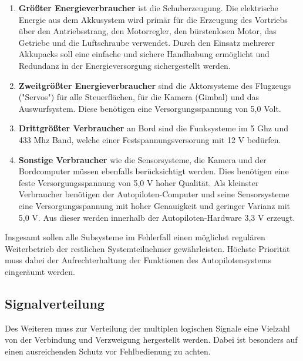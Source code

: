 \begin{enumerate}
    \item \textbf{Größter Energieverbraucher} ist die Schuberzeugung. Die elektrische Energie aus dem Akkusystem wird primär für die Erzeugung des Vortriebs über den Antriebsstrang, den Motorregler, den bürstenlosen Motor, das Getriebe und die Luftschraube verwendet. Durch den Einsatz mehrerer Akkupacks soll eine einfache und sichere Handhabung ermöglicht und Redundanz in der Energieversorgung sichergestellt werden.
    \begin{comment}??? In diesem Pfad soll die Verwendung mehrerer Quellen (Akkupacks) bei sicherer Handhabung ermöglicht werden. ???\end{comment}
    
    \item \textbf{Zweitgrößter Energieverbraucher} sind die Aktorsysteme des Flugzeugs ("Servos") für alle Steuerflächen, für die Kamera (Gimbal) und das Auswurfsystem. Diese benötigen eine Versorgungsspannung von 5,0 Volt.
    
    \item \textbf{Drittgrößter Verbraucher} an Bord sind die Funksysteme im 5 Ghz und 433 Mhz Band, welche einer Festspannungsversorung mit 12 V  bedürfen.

    \item \textbf{Sonstige Verbraucher} wie die Sensorsysteme, die Kamera und der Bordcomputer müssen ebenfalls berücksichtigt werden. Dies benötigen eine feste Versorgungsspannung von 5,0 V hoher Qualität. Als kleinster Verbraucher benötigen der Autopiloten-Computer und seine Sensorsysteme eine Versorgungsspannung mit hoher Genauigkeit und geringer Varianz mit 5,0 V. Aus dieser werden innerhalb der Autopiloten-Hardware 3,3 V erzeugt.
\end{enumerate}

Insgesamt sollen alle Subsysteme im Fehlerfall einen möglichst regulären Weiterbetrieb der restlichen Systemteilnehmer gewährleisten. Höchste Priorität muss dabei der Aufrechterhaltung der Funktionen des Autopilotensystems eingeräumt werden.


\subsection{Signalverteilung}

Des Weiteren muss zur Verteilung der multiplen logischen Signale eine Vielzahl von der Verbindung und Verzweigung hergestellt werden. Dabei ist besonders auf einen ausreichenden Schutz vor Fehlbedienung zu achten.

